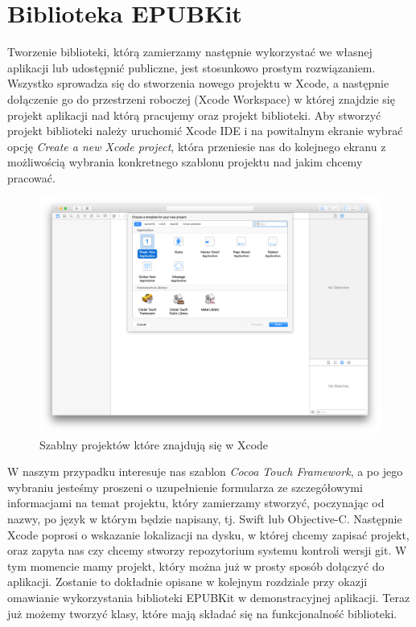 \chapter{Biblioteka EPUBKit}

Tworzenie biblioteki, którą zamierzamy następnie wykorzystać we własnej aplikacji lub udostępnić publiczne, jest stosunkowo prostym rozwiązaniem. Wszystko sprowadza się do stworzenia nowego projektu w Xcode, a następnie dołączenie go do przestrzeni roboczej (Xcode Workspace) w której znajdzie się projekt aplikacji nad którą pracujemy oraz projekt biblioteki. Aby stworzyć projekt biblioteki należy uruchomić Xcode IDE i na powitalnym ekranie wybrać opcję \textit{Create a new Xcode project}, która przeniesie nas do kolejnego ekranu z możliwością wybrania konkretnego szablonu projektu nad jakim chcemy pracować.

\begin{figure}[ht!]
  \centering
  \includegraphics[width=120mm]{images/chapter-4-image-1-new-project.png}
  \caption{Szablny projektów które znajdują się w Xcode}
  \label{chapter-4-image-1-new-project}
\end{figure}

W naszym przypadku interesuje nas szablon \textit{Cocoa Touch Framework}, a po jego wybraniu jesteśmy proszeni o uzupełnienie formularza ze szczegółowymi informacjami na temat projektu, który zamierzamy stworzyć, poczynając od nazwy, po język w którym będzie napisany, tj. Swift lub Objective-C. Następnie Xcode poprosi o wskazanie lokalizacji na dysku, w której chcemy zapisać projekt, oraz zapyta nas czy chcemy stworzy repozytorium systemu kontroli wersji git. W tym momencie mamy projekt, który można już w prosty sposób dołączyć do aplikacji. Zostanie to dokładnie opisane w kolejnym rozdziale przy okazji omawianie wykorzystania biblioteki EPUBKit w demonstracyjnej aplikacji. Teraz już możemy tworzyć klasy, które mają składać się na funkcjonalność biblioteki.

